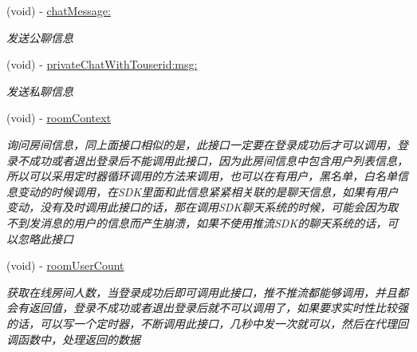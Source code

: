 \begin{DoxyCompactItemize}
\mbox{\label{interface_c_c_push_util_acd392a834f62338dd53eb5ad72be828a}} 
(void) -\/ \hyperlink{interface_c_c_push_util_acd392a834f62338dd53eb5ad72be828a}{chat\+Message\+:}
\begin{DoxyCompactList}\small\item\em 发送公聊信息 \end{DoxyCompactList}\item 
\mbox{\label{interface_c_c_push_util_af9f9ff382772ec3cf3b79494d54b98ef}} 
(void) -\/ \hyperlink{interface_c_c_push_util_af9f9ff382772ec3cf3b79494d54b98ef}{private\+Chat\+With\+Touserid\+:msg\+:}
\begin{DoxyCompactList}\small\item\em 发送私聊信息 \end{DoxyCompactList}\item 
\mbox{\label{interface_c_c_push_util_a1cc7fcf326f4aff8d88db2854958e05f}} 
(void) -\/ \hyperlink{interface_c_c_push_util_a1cc7fcf326f4aff8d88db2854958e05f}{room\+Context}
\begin{DoxyCompactList}\small\item\em 询问房间信息，同上面接口相似的是，此接口一定要在登录成功后才可以调用，登录不成功或者退出登录后不能调用此接口，因为此房间信息中包含用户列表信息，所以可以采用定时器循环调用的方法来调用，也可以在有用户，黑名单，白名单信息变动的时候调用，在\+S\+D\+K里面和此信息紧紧相关联的是聊天信息，如果有用户变动，没有及时调用此接口的话，那在调用\+S\+D\+K聊天系统的时候，可能会因为取不到发消息的用户的信息而产生崩溃，如果不使用推流\+S\+D\+K的聊天系统的话，可以忽略此接口 \end{DoxyCompactList}\item 
\mbox{\label{interface_c_c_push_util_aa91a422d0dcead13111b5aa03d17b5bd}} 
(void) -\/ \hyperlink{interface_c_c_push_util_aa91a422d0dcead13111b5aa03d17b5bd}{room\+User\+Count}
\begin{DoxyCompactList}\small\item\em 获取在线房间人数，当登录成功后即可调用此接口，推不推流都能够调用，并且都会有返回值，登录不成功或者退出登录后就不可以调用了，如果要求实时性比较强的话，可以写一个定时器，不断调用此接口，几秒中发一次就可以，然后在代理回调函数中，处理返回的数据 \end{DoxyCompactList}\end{DoxyCompactItemize}
